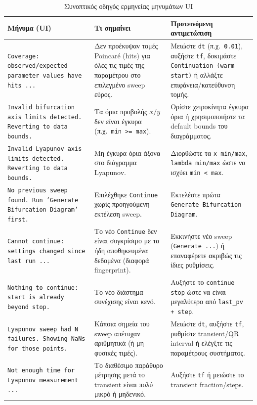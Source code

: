 \documentclass[11pt,a4paper]{report}
\begin{document}
\begin{table}[H]
\centering
\caption{Συνοπτικός οδηγός ερμηνείας μηνυμάτων UI}
\label{tab:ui-messages-troubleshooting}
\renewcommand{\arraystretch}{1.2}
\small
\begin{tabular}{|p{}|p{}|p{}|}
\hline
\textbf{Μήνυμα (UI)} & \textbf{Τι σημαίνει} & \textbf{Προτεινόμενη αντιμετώπιση} \\
\hline
\texttt{Coverage: observed/expected parameter values have hits ...} &
Δεν προέκυψαν τομές Poincaré (hits) για όλες τις τιμές της παραμέτρου στο επιλεγμένο sweep εύρος. &
Μειώστε \texttt{dt} (π.χ.\ \texttt{0.01}), αυξήστε \texttt{tf}, δοκιμάστε \texttt{Continuation (warm start)} ή αλλάξτε επιφάνεια/κατεύθυνση τομής. \\
\hline
\texttt{Invalid bifurcation axis limits detected. Reverting to data bounds.} &
Τα όρια προβολής $x/y$ δεν είναι έγκυρα (π.χ.\ \texttt{min >= max}). &
Ορίστε χειροκίνητα έγκυρα όρια ή χρησιμοποιήστε τα default bounds του διαγράμματος. \\
\hline
\texttt{Invalid Lyapunov axis limits detected. Reverting to data bounds.} &
Μη έγκυρα όρια άξονα στο διάγραμμα Lyapunov. &
Διορθώστε τα \texttt{x min/max}, \texttt{lambda min/max} ώστε να ισχύει \texttt{min < max}. \\
\hline
\texttt{No previous sweep found. Run 'Generate Bifurcation Diagram' first.} &
Επιλέχθηκε \texttt{Continue} χωρίς προηγούμενη εκτέλεση sweep. &
Εκτελέστε πρώτα \texttt{Generate Bifurcation Diagram}. \\
\hline
\texttt{Cannot continue: settings changed since last run ...} &
Το νέο \texttt{Continue} δεν είναι συγκρίσιμο με τα ήδη αποθηκευμένα δεδομένα (διαφορά fingerprint). &
Εκκινήστε νέο sweep (\texttt{Generate ...}) ή επαναφέρετε ακριβώς τις ίδιες ρυθμίσεις. \\
\hline
\texttt{Nothing to continue: start is already beyond stop.} &
Το νέο διάστημα συνέχισης είναι κενό. &
Αυξήστε το \texttt{continue stop} ώστε να είναι μεγαλύτερο από \texttt{last\_pv + step}. \\
\hline
\texttt{Lyapunov sweep had N failures. Showing NaNs for those points.} &
Κάποια σημεία του sweep απέτυχαν αριθμητικά (ή μη φυσικές τιμές). &
Μειώστε \texttt{dt}, αυξήστε \texttt{tf}, ρυθμίστε transient/QR interval ή ελέγξτε τις παραμέτρους συστήματος. \\
\hline
\texttt{Not enough time for Lyapunov measurement ...} &
Το διαθέσιμο παράθυρο μέτρησης μετά το transient είναι πολύ μικρό ή μηδενικό. &
Αυξήστε \texttt{tf} ή μειώστε το transient fraction/steps. \\

\end{tabular}
\end{table}
\end{document}

